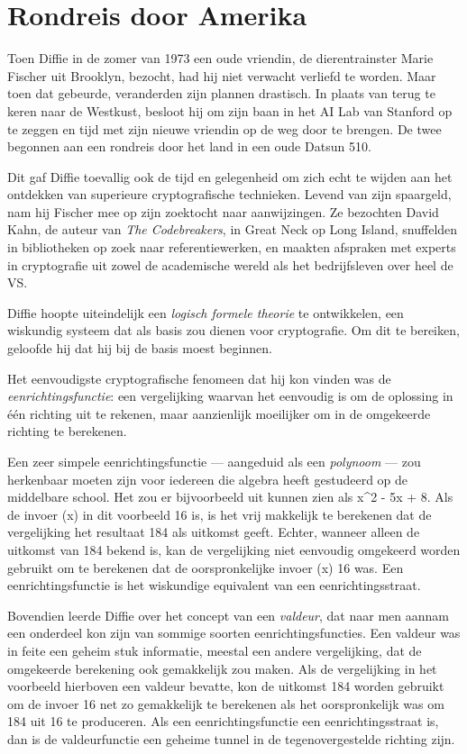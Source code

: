 \documentclass[
  a5paper,
  smalldemyvopaper,11pt,twoside,onecolumn,openright,extrafontsizes,
hidelinks]{memoir}
\begin{document}
\section{Rondreis door Amerika}\label{rondreis-door-amerika}

Toen Diffie in de zomer van 1973 een oude vriendin, de dierentrainster
Marie Fischer uit Brooklyn, bezocht, had hij niet verwacht verliefd te
worden. Maar toen dat gebeurde, veranderden zijn plannen drastisch. In
plaats van terug te keren naar de Westkust, besloot hij om zijn baan in
het AI Lab van Stanford op te zeggen en tijd met zijn nieuwe vriendin op
de weg door te brengen. De twee begonnen aan een rondreis door het land
in een oude Datsun 510.

Dit gaf Diffie toevallig ook de tijd en gelegenheid om zich echt te
wijden aan het ontdekken van superieure cryptografische technieken.
Levend van zijn spaargeld, nam hij Fischer mee op zijn zoektocht naar
aanwijzingen. Ze bezochten David Kahn, de auteur van \emph{The
Codebreakers}, in Great Neck op Long Island, snuffelden in bibliotheken
op zoek naar referentiewerken, en maakten afspraken met experts in
cryptografie uit zowel de academische wereld als het bedrijfsleven over
heel de VS.

Diffie hoopte uiteindelijk een \emph{logisch formele theorie} te
ontwikkelen, een wiskundig systeem dat als basis zou dienen voor
cryptografie. Om dit te bereiken, geloofde hij dat hij bij de basis
moest beginnen.

Het eenvoudigste cryptografische fenomeen dat hij kon vinden was de
\emph{eenrichtingsfunctie}: een vergelijking waarvan het eenvoudig is om
de oplossing in één richting uit te rekenen, maar aanzienlijk moeilijker
om in de omgekeerde richting te berekenen.

Een zeer simpele eenrichtingsfunctie --- aangeduid als een
\emph{polynoom} --- zou herkenbaar moeten zijn voor iedereen die algebra
heeft gestudeerd op de middelbare school. Het zou er bijvoorbeeld uit
kunnen zien als x\^{}2 - 5x + 8. Als de invoer (x) in dit voorbeeld 16
is, is het vrij makkelijk te berekenen dat de vergelijking het resultaat
184 als uitkomst geeft. Echter, wanneer alleen de uitkomst van 184
bekend is, kan de vergelijking niet eenvoudig omgekeerd worden gebruikt
om te berekenen dat de oorspronkelijke invoer (x) 16 was. Een
eenrichtingsfunctie is het wiskundige equivalent van een
eenrichtingsstraat.

Bovendien leerde Diffie over het concept van een \emph{valdeur}, dat
naar men aannam een onderdeel kon zijn van sommige soorten
eenrichtingsfuncties. Een valdeur was in feite een geheim stuk
informatie, meestal een andere vergelijking, dat de omgekeerde
berekening ook gemakkelijk zou maken. Als de vergelijking in het
voorbeeld hierboven een valdeur bevatte, kon de uitkomst 184 worden
gebruikt om de invoer 16 net zo gemakkelijk te berekenen als het
oorspronkelijk was om 184 uit 16 te produceren. Als een
eenrichtingsfunctie een eenrichtingsstraat is, dan is de valdeurfunctie
een geheime tunnel in de tegenovergestelde richting zijn.
\end{document}
